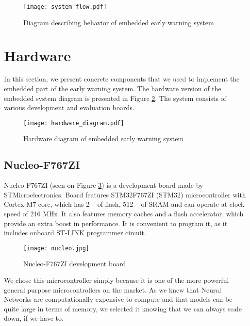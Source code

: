 \begin{figure}[ht]
        \centering
        \texttt{[image: system\_flow.pdf]} 
        \caption{ Diagram describing behavior of embedded early warning system} 
        \label{system_flow}
\end{figure}


\section{ Hardware}

In this section, we present concrete components that we used to implement the embedded part of the early warning system.
The hardware version of the embedded system diagram is presented in Figure \ref{hardware_diagram}.
The system consists of various development and evaluation boards.

\begin{figure}[ht]
        \centering
        \texttt{[image: hardware\_diagram.pdf]} 
        \caption{ Hardware diagram of embedded early warning system} 
        \label{hardware_diagram}
\end{figure}


\subsection{ Nucleo-F767ZI}

Nucleo-F767ZI (seen on Figure \ref{nucleo}) is a development board made by STMicroelectronics.
Board features STM32F767ZI (STM32) microcontroller with Cortex-M7 core, which has 2 \si{\mega\byte} of flash, 512 \si{\kilo\byte} of SRAM and can operate at clock speed of 216 \si{\mega\hertz}.
It also features memory caches and a flash accelerator, which provide an extra boost in performance.
It is convenient to program it, as it includes onboard ST-LINK programmer circuit.

\begin{figure}[ht]
        \centering
        \texttt{[image: nucleo.jpg]} 
        \caption{ Nucleo-F767ZI development board} 
        \label{nucleo}
\end{figure}

We chose this microcontroller simply because it is one of the more powerful general purpose microcontrollers on the market.
As we knew that Neural Networks are computationally expensive to compute and that models can be quite large in terms of memory, we selected it knowing that we can always scale down, if we have to.


